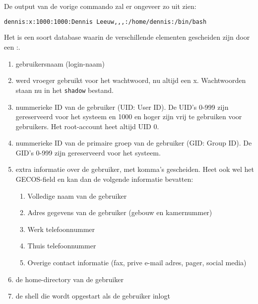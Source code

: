 De output van de vorige commando zal er ongeveer zo uit zien:
\begin{lstlisting}[language=bash]
dennis:x:1000:1000:Dennis Leeuw,,,:/home/dennis:/bin/bash
\end{lstlisting}
Het is een soort database waarin de verschillende elementen gescheiden zijn door een :.
\begin{enumerate}
	\item gebruikersnaam (login-naam)
	\item werd vroeger gebruikt voor het wachtwoord, nu altijd een x. Wachtwoorden staan nu in het \texttt{shadow} bestand.
	\item nummerieke ID van de gebruiker (UID: User ID). De UID's 0-999 zijn gereserveerd voor het systeem en 1000 en hoger zijn vrij te gebruiken voor gebruikers. Het root-account heet altijd UID 0.
	\item nummerieke ID van de primaire groep van de gebruiker (GID: Group ID). De GID's 0-999 zijn gereserveerd voor het systeem.
	\item extra informatie over de gebruiker, met komma's gescheiden. Heet ook wel het GECOS-field en kan dan de volgende informatie bevatten:
		\begin{enumerate}
			\item Volledige naam van de gebruiker
			\item Adres gegevens van de gebruiker (gebouw en kamernummer)
			\item Werk telefoonnummer
			\item Thuis telefoonnummer
			\item Overige contact informatie (fax, prive e-mail adres, pager, social media)
		\end{enumerate}
	\item de home-directory van de gebruiker
	\item de shell die wordt opgestart als de gebruiker inlogt
\end{enumerate}
